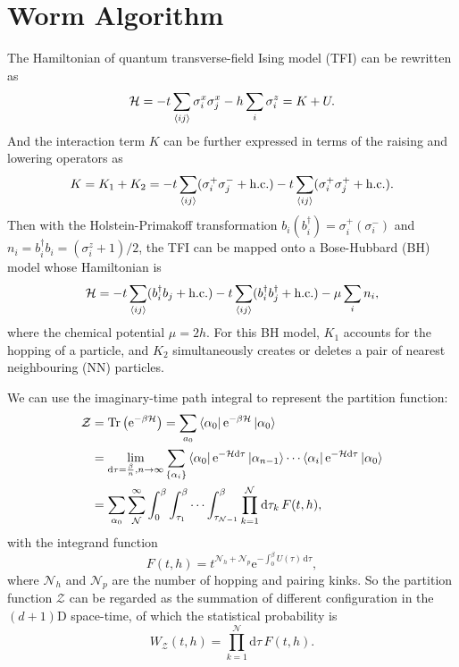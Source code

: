 \documentclass{article}
\DeclareMathOperator{\Tr}{Tr}
\theoremstyle{plain} \newtheorem{thm}{Theorem}[section]
\theoremstyle{definition} \newtheorem{df}{Definition}[section]
\theoremstyle{definition} \newtheorem{eg}{Example}
\theoremstyle{remark} \newtheorem*{rmk}{Remark}
\begin{document}
\section{Worm Algorithm}
The Hamiltonian of quantum transverse-field Ising model (TFI) can be rewritten as
\begin{equation}
  \mathcal{H} = -t\sum_{\braket{ij}}\sigma_i^x\sigma_j^x - h\sum_{i}\sigma_i^z = K+U.
\end{equation}
And the interaction term $K$ can be further expressed in terms of the raising and lowering operators as
\begin{equation}
  K = K_1+K_2 = -t\sum_{\braket{ij}}(\sigma_i^+\sigma_j^-+\text{h.c.})-t\sum_{\braket{ij}}(\sigma_i^+\sigma_j^++\text{h.c.}).
\end{equation}
Then with the Holstein-Primakoff transformation $b_i(b_i^\dag) = \sigma_i^+(\sigma_i^-)$ and $n_i = b_i^\dag b_i = (\sigma_i^z+1)/2$, the TFI can be mapped onto a Bose-Hubbard (BH) model whose Hamiltonian is
\begin{equation}
  \mathcal{H} = -t\sum_{\braket{ij}}(b_i^\dag b_j+\text{h.c.})-t\sum_{\braket{ij}}(b_i^\dag b_j^\dag+\text{h.c.})-\mu\sum_{i}n_i, 
\end{equation}
where the chemical potential $\mu = 2h$. For this BH model, $K_1$ accounts for the hopping of a particle, and $K_2$ simultaneously creates or deletes a pair of nearest neighbouring (NN) particles.

We can use the imaginary-time path integral to represent the partition function: 
\begin{align}
  \mathcal{Z} &= \Tr \left(\mathrm{e}^{-\beta \mathcal{H}}\right) = \sum_{a_0}\bra{\alpha_0}\mathrm{e}^{-\beta \mathcal{H}}\ket{\alpha_0}\\
              &= \lim_{\mathrm{d}\tau = \frac{\beta}{n}, n \to \infty} \sum_{\{\alpha_i\}}\bra{\alpha_0}\mathrm{e}^{-\mathcal{H}\mathrm{d}\tau}\ket{\alpha_{n-1}}\cdots \bra{\alpha_i}\mathrm{e}^{-\mathcal{H}\mathrm{d}\tau}\ket{\alpha_0}\\
              &= \sum_{\alpha_0}\sum_{\mathcal{N}}^{\infty}\int_{0}^{\beta}\int_{\tau_1}^{\beta}\cdots \int_{\tau_{\mathcal{N}-1}}^{\beta} \prod_{k=1}^{\mathcal{N}}\mathrm{d}\tau_k\,F(t, h),
\end{align}
with the integrand function
\begin{equation}
  F(t, h) = t^{\mathcal{N}_h+\mathcal{N}_p}\mathrm{e}^{-\int_{0}^{\beta}U(\tau)\,\mathrm{d}\tau},
  \label{eq:integrand}
\end{equation}
where $\mathcal{N}_h$ and $\mathcal{N}_p$ are the number of hopping and pairing kinks. So the partition function $\mathcal{Z}$ can be regarded as the summation of different configuration in the $(d+1)$D space-time, of which the statistical probability is
\begin{equation}
  W_{\mathcal{Z}}(t, h) = \prod_{k=1}^{\mathcal{N}}\mathrm{d}\tau\,F(t, h).
\end{equation}
\end{document}
